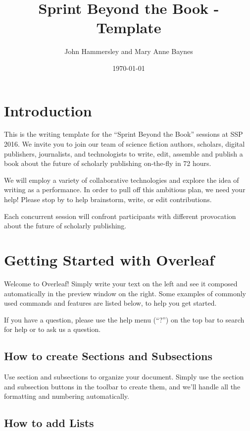 \documentclass{tufte-handout}
\title[Short Title]{Sprint Beyond the Book - Template}
\author{John Hammersley and Mary Anne Baynes}
\date{\today}
\begin{document}
\maketitle
\logos

\section{Introduction}

This is the writing template for the ``Sprint Beyond the Book'' sessions at SSP 2016. We invite you to join our team of science fiction authors, scholars, digital publishers, journalists, and technologists to write, edit, assemble and publish a book about the future of scholarly publishing on-the-fly in 72 hours. 

We will employ a variety of collaborative technologies and explore the idea of writing as a performance. In order to pull off this ambitious plan, we need your help! Please stop by to help brainstorm, write, or edit contributions. 

Each concurrent session will confront participants with different provocation about the future of scholarly publishing.

\section{Getting Started with Overleaf}

Welcome to Overleaf! Simply write your text on the left and see it composed automatically in the preview window on the right. Some examples of commonly used commands and features are listed below, to help you get started.

If you have a question, please use the help menu (``?'') on the top bar to search for help or to ask us a question.

\subsection{How to create Sections and Subsections}

Use section and subsections to organize your document. Simply use the section and subsection buttons in the toolbar to create them, and we'll handle all the formatting and numbering automatically.

\subsection{How to add Lists}
\end{document}
